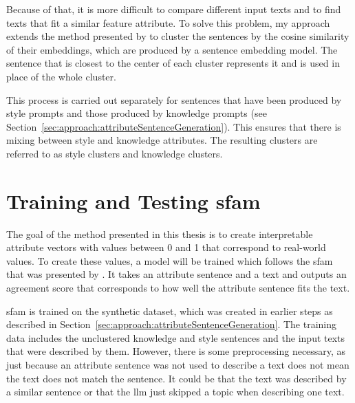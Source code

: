 Because of that, it is more difficult to compare different input texts and to find texts that fit a similar feature attribute.
To solve this problem, my approach extends the method presented by \citet{patelLearningInterpretableStyle2023} to cluster the sentences by the cosine similarity of their embeddings, which are produced by a sentence embedding model.
The sentence that is closest to the center of each cluster represents it and is used in place of the whole cluster.

This process is carried out separately for sentences that have been produced by style prompts and those produced by knowledge prompts (see Section~\ref{sec:approach:attributeSentenceGeneration}). This ensures that there is mixing between style and knowledge attributes.
The resulting clusters are referred to as style clusters and knowledge clusters.


\section{Training and Testing \acs{sfam}}
\label{sec:approach:sfam}

The goal of the method presented in this thesis is to create interpretable attribute vectors with values between \num{0} and \num{1} that correspond to real-world values. To create these values, a model will be trained which follows the \acf{sfam} that was presented by \citet{patelLearningInterpretableStyle2023}. It takes an attribute sentence and a text and outputs an agreement score that corresponds to how well the attribute sentence fits the text.

\ac{sfam} is trained on the synthetic dataset, which was created in earlier steps as described in Section~\ref{sec:approach:attributeSentenceGeneration}. The training data includes the unclustered knowledge and style sentences and the input texts that were described by them. However, there is some preprocessing necessary, as just because an attribute sentence was not used to describe a text does not mean the text does not match the sentence. It could be that the text was described by a similar sentence or that the \ac{llm} just skipped a topic when describing one text.

